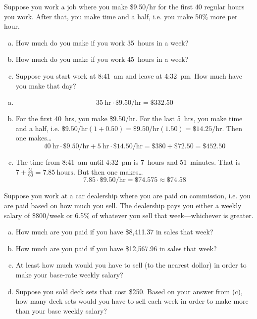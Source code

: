 \documentclass[11pt,letterpaper]{article}
\begin{document}
\newpage





 Suppose you work a job where you make \$9.50/hr for the first 40 regular hours you work. After that, you make time and a half, i.e. you make 50\% more per hour. 
\begin{enumerate}[(a)]
\item How much do you make if you work 35~hours in a week?
\item How much do you make if you work 45~hours in a week?
\item Suppose you start work at 8:41~am and leave at 4:32~pm. How much have you make that day?
\end{enumerate} \pspace

\sol
{\itshape
\begin{enumerate}[(a)]
\item 
	\[
	35~\text{hr} \cdot \$9.50\text{/hr}= \$332.50
	\] \pspace

\item For the first 40~hrs, you make \$9.50/hr. For the last 5~hrs, you make time and a half, i.e. $\$9.50\text{/hr}(1 + 0.50)= \$9.50\text{/hr}(1.50)= \$14.25\text{/hr}$. Then one makes\dots
	\[
	40~\text{hr} \cdot \$9.50\text{/hr} + 5~\text{hr} \cdot \$14.50\text{/hr}= \$380 + \$72.50= \$452.50
	\] \pspace

\item The time from 8:41~am until 4:32~pm is 7~hours and 51~minutes. That is $7 + \frac{51}{60}= 7.85~\text{hours}$. But then one makes\dots
	\[
	7.85 \cdot \$9.50\text{/hr}= \$74.575 \approx \$74.58
	\]
\end{enumerate}
}





\newpage





 Suppose you work at a car dealership where you are paid on commission, i.e. you are paid based on how much you sell. The dealership pays you either a weekly salary of \$800/week or 6.5\% of whatever you sell that week---whichever is greater.
\begin{enumerate}[(a)]
\item How much are you paid if you have \$8,411.37 in sales that week?
\item How much are you paid if you have \$12,567.96 in sales that week?
\item At least how much would you have to sell (to the nearest dollar) in order to make your base-rate weekly salary?
\item Suppose you sold deck sets that cost \$250. Based on your answer from (c), how many deck sets would you have to sell each week in order to make more than your base weekly salary? 
\end{enumerate} \pspace
\end{document}
